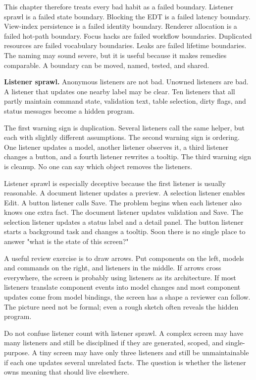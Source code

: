 This chapter therefore treats every bad habit as a failed boundary. Listener
sprawl is a failed state boundary. Blocking the EDT is a failed latency
boundary. View-index persistence is a failed identity boundary. Renderer
allocation is a failed hot-path boundary. Focus hacks are failed workflow
boundaries. Duplicated resources are failed vocabulary boundaries. Leaks are
failed lifetime boundaries. The naming may sound severe, but it is useful
because it makes remedies comparable. A boundary can be moved, named, tested,
and shared.

\textbf{Listener sprawl.}
Anonymous listeners are not bad. Unowned listeners are bad. A listener that updates one nearby label may be clear. Ten listeners that all partly maintain command state, validation text, table selection, dirty flags, and status messages become a hidden program.

The first warning sign is duplication. Several listeners call the same helper, but each with slightly different assumptions. The second warning sign is ordering. One listener updates a model, another listener observes it, a third listener changes a button, and a fourth listener rewrites a tooltip. The third warning sign is cleanup. No one can say which object removes the listeners.

Listener sprawl is especially deceptive because the first listener is usually
reasonable. A document listener updates a preview. A selection listener enables
Edit. A button listener calls Save. The problem begins when each listener also
knows one extra fact. The document listener updates validation and Save. The
selection listener updates a status label and a detail panel. The button
listener starts a background task and changes a tooltip. Soon there is no single
place to answer "what is the state of this screen?"

A useful review exercise is to draw arrows. Put components on the left, models
and commands on the right, and listeners in the middle. If arrows cross
everywhere, the screen is probably using listeners as its architecture. If most
listeners translate component events into model changes and most component
updates come from model bindings, the screen has a shape a reviewer can follow.
The picture need not be formal; even a rough sketch often reveals the hidden
program.

Do not confuse listener count with listener sprawl. A complex screen may have
many listeners and still be disciplined if they are generated, scoped, and
single-purpose. A tiny screen may have only three listeners and still be
unmaintainable if each one updates several unrelated facts. The question is
whether the listener owns meaning that should live elsewhere.

